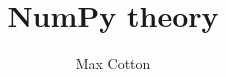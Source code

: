 \documentclass[10pt,a4paper]{article}
\title{NumPy theory}
\author{Max Cotton}
\date{}
\begin{document}
\maketitle

\section{}
\end{document}
